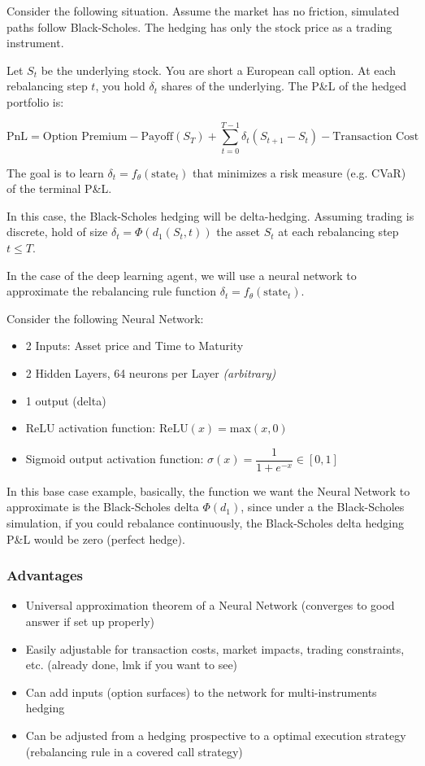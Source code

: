 \documentclass[11pt]{article}
\begin{document}
Consider the following situation. Assume the market has no friction, simulated paths follow Black-Scholes. The hedging has only the stock price as a trading instrument.

Let $S_t$ be the underlying stock. You are short a European call option. At each rebalancing step $t$, you hold $\delta_t$ shares of the underlying. The P\&L of the hedged portfolio is:

$$
\text{PnL} = \text{Option Premium} - \text{Payoff}(S_T) + \sum_{t=0}^{T-1} \delta_t (S_{t+1} - S_t) - \text{Transaction Cost}
$$

The goal is to learn $\delta_t = f_\theta(\text{state}_t)$ that minimizes a risk measure (e.g. CVaR) of the terminal P\&L.

In this case, the Black-Scholes hedging will be delta-hedging. Assuming trading is discrete, hold of size $\delta_t = \Phi(d_1(S_t, t))$ the asset $S_t$ at each rebalancing step $t \leq T$.

\vspace{1em}

In the case of the deep learning agent, we will use a neural network to approximate the rebalancing rule function $\delta_t = f_\theta(\text{state}_t)$.

Consider the following Neural Network:
\begin{itemize}
    \item 2 Inputs: Asset price and Time to Maturity
    \item 2 Hidden Layers, 64 neurons per Layer \textit{(arbitrary)}
    \item 1 output (delta)
    \item ReLU activation function: $\text{ReLU}(x) = \text{max}(x, 0)$
    \item Sigmoid output activation function: $\sigma(x) = \dfrac{1}{1+e^{-x}} \in [0,1]$
\end{itemize}

In this base case example, basically, the function we want the Neural Network to approximate is the Black-Scholes delta $\Phi(d_1)$, since under a the Black-Scholes simulation, if you could rebalance continuously, the Black-Scholes delta hedging P\&L would be zero (perfect hedge).

\subsubsection*{Advantages}

\begin{itemize}
    \item Universal approximation theorem of a Neural Network (converges to good answer if set up properly)
    \item Easily adjustable for transaction costs, market impacts, trading constraints, etc. (already done, lmk if you want to see)
    \item Can add inputs (option surfaces) to the network for multi-instruments hedging
    \item Can be adjusted from a hedging prospective to a optimal execution strategy (rebalancing rule in a covered call strategy)
\end{itemize}
\end{document}
